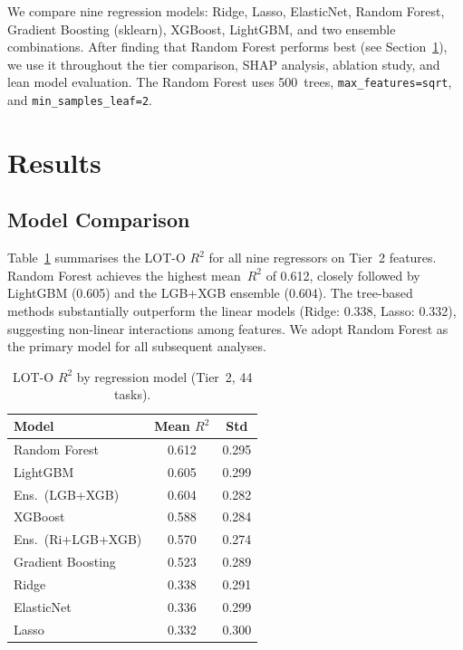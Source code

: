 \documentclass[11pt,a4paper,twocolumn]{article}
\begin{document}
We compare nine regression models: Ridge, Lasso, ElasticNet, Random Forest, Gradient Boosting (sklearn), XGBoost, LightGBM, and two ensemble combinations.
After finding that Random Forest performs best (see Section~\ref{sec:results}), we use it throughout the tier comparison, SHAP analysis, ablation study, and lean model evaluation.
The Random Forest uses 500~trees, \texttt{max\_features=sqrt}, and \texttt{min\_samples\_leaf=2}.


\section{Results}
\label{sec:results}

\subsection{Model Comparison}

Table~\ref{tab:model_comparison} summarises the LOT-O $R^2$ for all nine regressors on Tier~2 features.
Random Forest achieves the highest mean~$R^2$ of 0.612, closely followed by LightGBM (0.605) and the LGB+XGB ensemble (0.604).
The tree-based methods substantially outperform the linear models (Ridge: 0.338, Lasso: 0.332), suggesting non-linear interactions among features.
We adopt Random Forest as the primary model for all subsequent analyses.

\begin{table}[H]
\centering
\small
\caption{LOT-O $R^2$ by regression model (Tier~2, 44 tasks).}
\label{tab:model_comparison}
\begin{tabular}{lcc}
\toprule
Model & Mean $R^2$ & Std \\
\midrule
Random Forest       & 0.612 & 0.295 \\
LightGBM            & 0.605 & 0.299 \\
Ens.\ (LGB+XGB)     & 0.604 & 0.282 \\
XGBoost             & 0.588 & 0.284 \\
Ens.\ (Ri+LGB+XGB)  & 0.570 & 0.274 \\
Gradient Boosting   & 0.523 & 0.289 \\
Ridge               & 0.338 & 0.291 \\
ElasticNet          & 0.336 & 0.299 \\
Lasso               & 0.332 & 0.300 \\
\bottomrule
\end{tabular}
\end{table}
\end{document}
